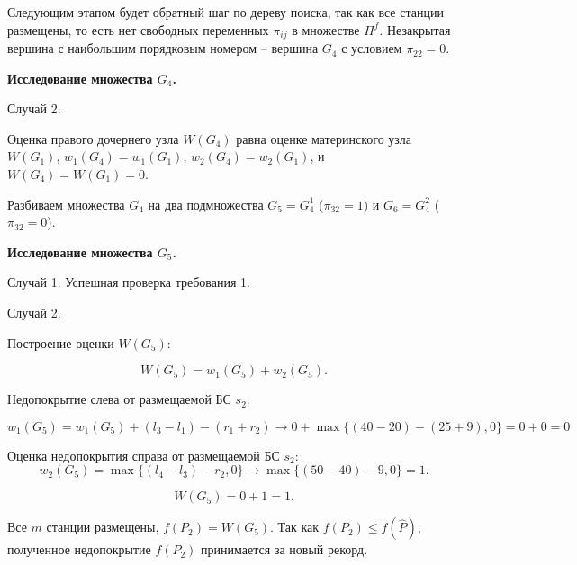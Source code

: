 Следующим этапом будет обратный шаг по дереву поиска, так как все станции размещены, то есть нет свободных переменных $\pi_{ij}$ в множестве $\Pi^f$. Незакрытая вершина с наибольшим порядковым номером -- вершина $G_4$ с условием $\pi_{22}=0$.

\textbf{Исследование множества $G_4$.}


Случай 2.

Оценка правого дочернего узла $W(G_4)$ равна оценке материнского узла $W(G_1)$, $w_1(G_4)=w_1(G_1)$, $w_2(G_4) = w_2(G_1)$, и $W(G_4) = W(G_1) = 0$.


Разбиваем множества $G_4$ на два подмножества $G_5 = G^1_4$ ($\pi_{32} = 1$) и $G_6 = G^2_4$ ($\pi_{32} = 0$).

\textbf{Исследование множества $G_5$.}

Случай 1. Успешная проверка требования 1.


Случай 2.

Построение оценки $W(G_5)$:

$$
W(G_5) = w_1(G_5) + w_2(G_5).
$$

Недопокрытие слева от размещаемой БС $s_2$:

$$
w_1(G_5) =  w_1(G_5) + (l_3 - l_1) - (r_1 + r_2) \rightarrow 0 + \max\{(40 - 20) - (25+ 9), 0\} = 0 + 0 = 0
$$

Оценка недопокрытия справа от размещаемой БС $s_2$: 
$$
w_2(G_5) = \max\{(l_4 - l_3) - r_2, 0\} \rightarrow \max\{(50 - 40) - 9, 0\} = 1.
$$

$$
W(G_5) = 0 + 1 = 1.
$$

Все $m$ станции размещены, $f(P_2) = W(G_5)$. Так как $f(P_2) \leqslant f(\widehat{P})$, полученное недопокрытие $f(P_2)$ принимается за новый рекорд.



